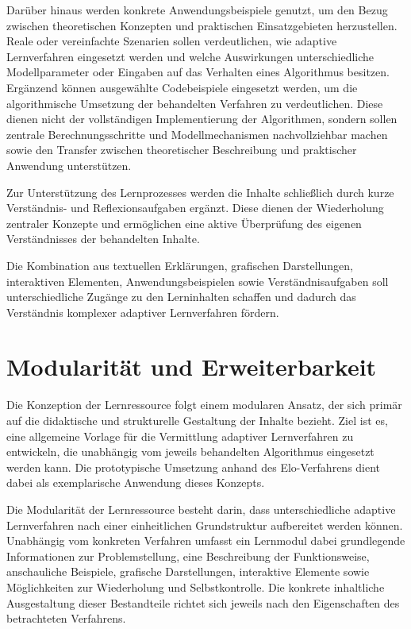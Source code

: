 Darüber hinaus werden konkrete Anwendungsbeispiele genutzt, um den Bezug
zwischen theoretischen Konzepten und praktischen Einsatzgebieten
herzustellen. Reale oder vereinfachte Szenarien sollen verdeutlichen,
wie adaptive Lernverfahren eingesetzt werden und welche Auswirkungen
unterschiedliche Modellparameter oder Eingaben auf das Verhalten eines
Algorithmus besitzen. Ergänzend können ausgewählte Codebeispiele
eingesetzt werden, um die algorithmische Umsetzung der behandelten
Verfahren zu verdeutlichen. Diese dienen nicht der vollständigen
Implementierung der Algorithmen, sondern sollen zentrale
Berechnungsschritte und Modellmechanismen nachvollziehbar machen sowie
den Transfer zwischen theoretischer Beschreibung und praktischer
Anwendung unterstützen.

Zur Unterstützung des Lernprozesses werden die Inhalte schließlich durch
kurze Verständnis- und Reflexionsaufgaben ergänzt. Diese dienen der
Wiederholung zentraler Konzepte und ermöglichen eine aktive Überprüfung
des eigenen Verständnisses der behandelten Inhalte.

Die Kombination aus textuellen Erklärungen, grafischen Darstellungen,
interaktiven Elementen, Anwendungsbeispielen sowie Verständnisaufgaben
soll unterschiedliche Zugänge zu den Lerninhalten schaffen und dadurch
das Verständnis komplexer adaptiver Lernverfahren fördern.

\section{Modularität und
Erweiterbarkeit}\label{modularituxe4t-und-erweiterbarkeit}

Die Konzeption der Lernressource folgt einem modularen Ansatz, der sich
primär auf die didaktische und strukturelle Gestaltung der Inhalte
bezieht. Ziel ist es, eine allgemeine Vorlage für die Vermittlung
adaptiver Lernverfahren zu entwickeln, die unabhängig vom jeweils
behandelten Algorithmus eingesetzt werden kann. Die prototypische
Umsetzung anhand des Elo-Verfahrens dient dabei als exemplarische
Anwendung dieses Konzepts.

Die Modularität der Lernressource besteht darin, dass unterschiedliche
adaptive Lernverfahren nach einer einheitlichen Grundstruktur
aufbereitet werden können. Unabhängig vom konkreten Verfahren umfasst
ein Lernmodul dabei grundlegende Informationen zur Problemstellung, eine
Beschreibung der Funktionsweise, anschauliche Beispiele, grafische
Darstellungen, interaktive Elemente sowie Möglichkeiten zur Wiederholung
und Selbstkontrolle. Die konkrete inhaltliche Ausgestaltung dieser
Bestandteile richtet sich jeweils nach den Eigenschaften des
betrachteten Verfahrens.

